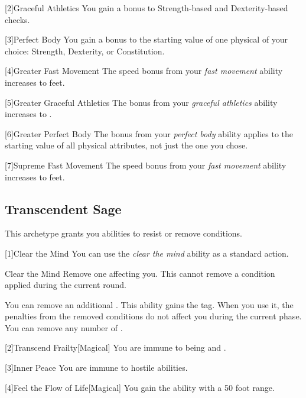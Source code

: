         [2]{Graceful Athletics} You gain a  bonus to Strength-based and Dexterity-based checks.

        [3]{Perfect Body} You gain a  bonus to the starting value of one physical  of your choice: Strength, Dexterity, or Constitution.

        [4]{Greater Fast Movement} The speed bonus from your \textit{fast movement} ability increases to  feet.

        [5]{Greater Graceful Athletics} The bonus from your \textit{graceful athletics} ability increases to .

        [6]{Greater Perfect Body} The bonus from your \textit{perfect body} ability applies to the starting value of all physical attributes, not just the one you chose.

        [7]{Supreme Fast Movement} The speed bonus from your \textit{fast movement} ability increases to  feet.

    \subsection{Transcendent Sage}
        This archetype grants you abilities to resist or remove conditions.

        [1]{Clear the Mind} You can use the \textit{clear the mind} ability as a standard action.
        \begin{freeability}{Clear the Mind}
            Remove one  affecting you.
            This cannot remove a condition applied during the current round.

            \rankline
             You can remove an additional .
             This ability gains the  tag.
            When you use it, the penalties from the removed conditions do not affect you during the current phase.
             You can remove any number of .
        \end{freeability}

        [2]{Transcend Frailty}[Magical]
        You are immune to being  and .

        [3]{Inner Peace} You are immune to hostile  abilities.

        [4]{Feel the Flow of Life}[Magical] You gain the  ability with a 50 foot range.

